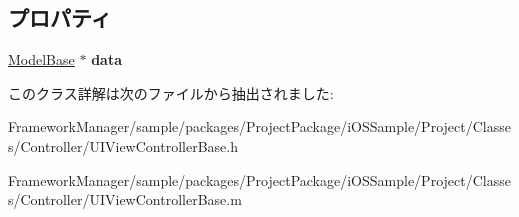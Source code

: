 \subsection*{プロパティ}
\begin{DoxyCompactItemize}
\item 
\hypertarget{interface_u_i_view_controller_base_ac4b25f0b6f3376acfc84ad7cfeb5ddbe}{}\hyperlink{interface_model_base}{Model\+Base} $\ast$ {\bfseries data}\label{interface_u_i_view_controller_base_ac4b25f0b6f3376acfc84ad7cfeb5ddbe}

\end{DoxyCompactItemize}


このクラス詳解は次のファイルから抽出されました\+:\begin{DoxyCompactItemize}
\item 
Framework\+Manager/sample/packages/\+Project\+Package/i\+O\+S\+Sample/\+Project/\+Classes/\+Controller/U\+I\+View\+Controller\+Base.\+h\item 
Framework\+Manager/sample/packages/\+Project\+Package/i\+O\+S\+Sample/\+Project/\+Classes/\+Controller/U\+I\+View\+Controller\+Base.\+m\end{DoxyCompactItemize}
